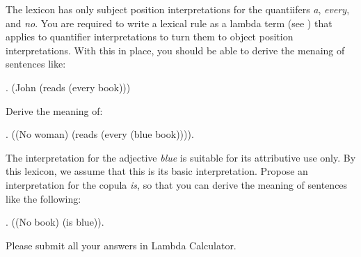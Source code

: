 \documentclass[10pt,a4paper]{exam}
\begin{document}
\begin{questions}
\question

The lexicon has only subject position interpretations for the
quantiifers \emph{a}, \emph{every}, and \emph{no}. You are required to
write a lexical rule as a lambda term (see ) that applies
to quantifier interpretations to turn them to object position
interpretations. With this in place, you should be able to derive the
menaing of sentences like:

\ex. (John (reads (every book)))

\question

Derive the meaning of:

\ex. ((No woman) (reads (every (blue book)))).


\question

The interpretation for the adjective \emph{blue} is suitable for its
attributive use only. By this lexicon, we assume that this is its
basic interpretation. Propose an interpretation for the copula
\emph{is}, so that you can derive the meaning of sentences like the
following:

\ex. ((No book) (is blue)).



\end{questions}


Please submit all your answers in Lambda Calculator.
\end{document}
